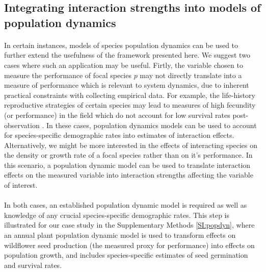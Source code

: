 \documentclass[a4,12pt]{article}
\begin{document}
    \subsection{Integrating interaction strengths into models of population dynamics}

        \paragraph{}
        In certain instances, models of species population dynamics can be used to further extend the usefulness of the framework presented here. We suggest two cases where such an application may be useful. Firtly, the variable chosen to measure the performance of focal species $p$ may not directly translate into a measure of performance which is relevant to system dynamics,  due to inherent practical constraints with collecting empirical data. For example, the life-history reproductive strategies of certain species may lead to measures of high fecundity (or performance) in the field which do not account for low survival rates post-observation \parencite{Broekman2020}. In these cases, population dynamics models can be used to account for species-specific demographic rates into estimates of interaction effects. Alternatively, we might be more interested in the effects of interacting species on the density or growth rate of a focal species rather than on it's performance. In this scenario, a population dynamic model can be used to translate interaction effects on the measured variable into interaction strengths affecting the variable of interest. 

        \paragraph{}
        In both cases, an established population dynamic model is required as well as knowledge of any crucial species-specific demographic rates. This step is illustrated for our case study in the Supplementary Methods \ref{SI:popdyn}, where an annual plant population dynamic model is used to transform effects on wildflower seed production (the measured proxy for performance) into effects on population growth, and includes species-specific estimates of seed germination and survival rates. 

\end{document}
